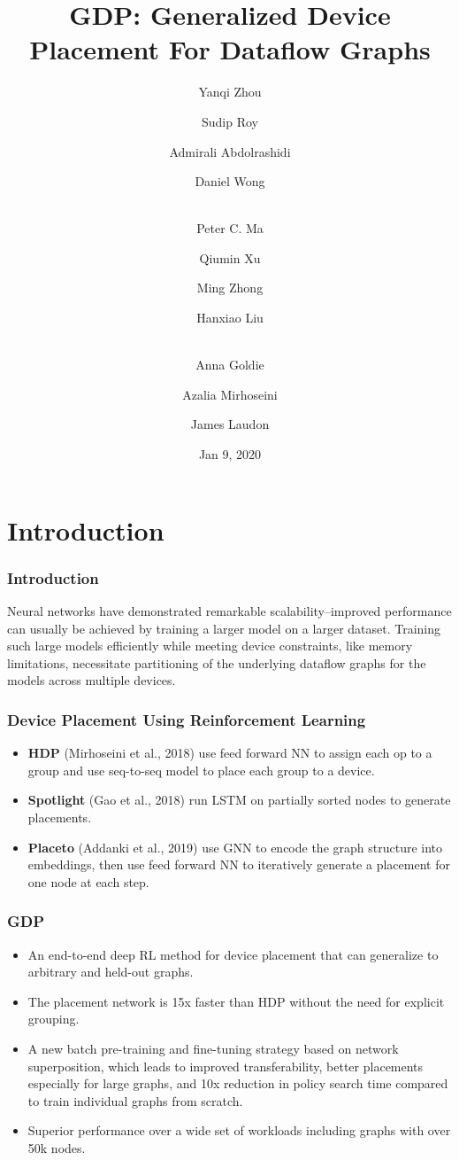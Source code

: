 \documentclass[12pt,aspectratio=169]{beamer}
\title{GDP: Generalized Device Placement For Dataflow Graphs}
\author{Yanqi Zhou \and %
        Sudip Roy \and %
        Admirali Abdolrashidi \and %
        Daniel Wong \and \\ %
        Peter C. Ma \and %
        Qiumin Xu \and %
        Ming Zhong \and %
        Hanxiao Liu \and \\ %
        Anna Goldie \and %
        Azalia Mirhoseini \and %
        James Laudon}%
\institute{Google Brain}
\date{Jan 9, 2020}
\begin{document}
    \beamertemplatenavigationsymbolsempty
    
    \begin{frame}
        \titlepage
    \end{frame}

    \section{Introduction}

    \begin{frame}
        \frametitle{Introduction}

        Neural networks have demonstrated remarkable scalability–improved performance can usually be achieved by training a
        larger model on a larger dataset. Training such large models efficiently while meeting device constraints, like
        memory limitations, necessitate partitioning of the underlying dataflow graphs for the models across multiple
        devices.
    \end{frame}

    \begin{frame}
        \frametitle{Device Placement Using Reinforcement Learning}

        \begin{itemize}
            \setlength{\itemsep}{1.4em}
            \item \textbf{HDP} (Mirhoseini et al., 2018) use feed forward NN to assign each op to a group and use seq-to-seq
                model to place each group to a device.
            \item \textbf{Spotlight} (Gao et al., 2018) run LSTM on partially sorted nodes to generate placements.
            \item \textbf{Placeto} (Addanki et al., 2019) use GNN to encode the graph structure into embeddings, then
                use feed forward NN to iteratively generate a placement for one node at each step.
        \end{itemize}
    \end{frame}

    \begin{frame}
        \frametitle{GDP}

        \begin{itemize}
            \setlength{\itemsep}{.8em}
            \item An end-to-end deep RL method for device placement that can generalize to arbitrary and held-out graphs.
            \item The placement network is 15x faster than HDP without the need for explicit grouping.
            \item A new batch pre-training and fine-tuning strategy based on network superposition, which leads to improved
                transferability, better placements especially for large graphs, and 10x reduction in policy search time
                compared to train individual graphs from scratch.
            \item Superior performance over a wide set of workloads including graphs with over 50k nodes.
        \end{itemize}
    \end{frame}
\end{document}
